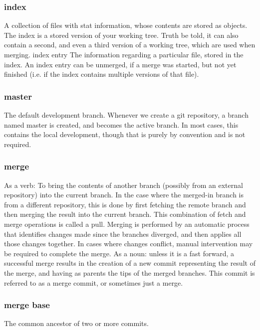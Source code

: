 \subsubsection{index}

A collection of files with stat information, whose contents are stored as objects. The index is a stored version of your working tree. Truth be told, it can also contain a second, and even a third version of a working tree, which are used when merging.
index entry
The information regarding a particular file, stored in the index. An index entry can be unmerged, if a merge was started, but not yet finished (i.e. if the index contains multiple versions of that file).

\subsubsection{master}

The default development branch. Whenever we create a git repository, a branch named master is created, and becomes the active branch. In most cases, this contains the local development, though that is purely by convention and is not required.

\subsubsection{merge}

As a verb: To bring the contents of another branch (possibly from an external repository) into the current branch. In the case where the merged-in branch is from a different repository, this is done by first fetching the remote branch and then merging the result into the current branch. This combination of fetch and merge operations is called a pull. Merging is performed by an automatic process that identifies changes made since the branches diverged, and then applies all those changes together. In cases where changes conflict, manual intervention may be required to complete the merge.
As a noun: unless it is a fast forward, a successful merge results in the creation of a new commit representing the result of the merge, and having as parents the tips of the merged branches. This commit is referred to as a merge commit, or sometimes just a merge.

\subsubsection{merge base}

The common ancestor of two or more commits.


